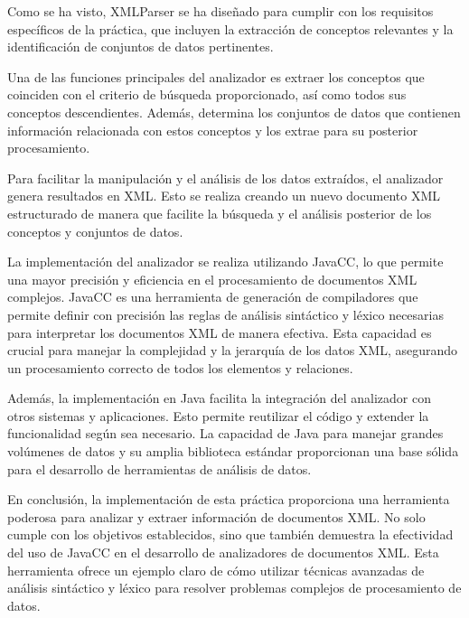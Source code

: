 
Como se ha visto, XMLParser se ha diseñado para cumplir con los requisitos específicos de la práctica, que incluyen la extracción de conceptos relevantes y la identificación de conjuntos de datos pertinentes.

Una de las funciones principales del analizador es extraer los conceptos que coinciden con el criterio de búsqueda proporcionado, así como todos sus conceptos descendientes. Además, determina los conjuntos de datos que contienen información relacionada con estos conceptos y los extrae para su posterior procesamiento.

Para facilitar la manipulación y el análisis de los datos extraídos, el analizador genera resultados en XML. Esto se realiza creando un nuevo documento XML estructurado de manera que facilite la búsqueda y el análisis posterior de los conceptos y conjuntos de datos.

La implementación del analizador se realiza utilizando JavaCC, lo que permite una mayor precisión y eficiencia en el procesamiento de documentos XML complejos. JavaCC es una herramienta de generación de compiladores que permite definir con precisión las reglas de análisis sintáctico y léxico necesarias para interpretar los documentos XML de manera efectiva. Esta capacidad es crucial para manejar la complejidad y la jerarquía de los datos XML, asegurando un procesamiento correcto de todos los elementos y relaciones.

Además, la implementación en Java facilita la integración del analizador con otros sistemas y aplicaciones. Esto permite reutilizar el código y extender la funcionalidad según sea necesario. La capacidad de Java para manejar grandes volúmenes de datos y su amplia biblioteca estándar proporcionan una base sólida para el desarrollo de herramientas de análisis de datos.

En conclusión, la implementación de esta práctica proporciona una herramienta poderosa para analizar y extraer información de documentos XML. No solo cumple con los objetivos establecidos, sino que también demuestra la efectividad del uso de JavaCC en el desarrollo de analizadores de documentos XML. Esta herramienta ofrece un ejemplo claro de cómo utilizar técnicas avanzadas de análisis sintáctico y léxico para resolver problemas complejos de procesamiento de datos.

